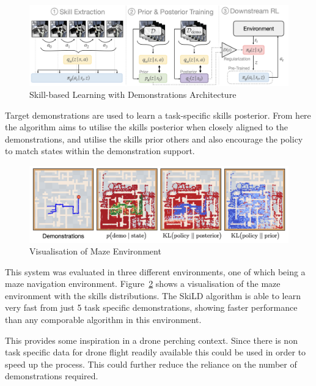 \begin{figure}[htbp]
  \centering
  \includegraphics[width=\textwidth]{background/fyp15-skild-architecture.png}
  \caption{Skill-based Learning with Demonstrations Architecture}
\label{fig:fyp15-skild}
\end{figure}

Target demonstrations are used to learn a task-specific skills posterior.
From here the algorithm aims to utilise the skills posterior when closely aligned to the demonstrations, and utilise the skills prior others and also encourage the policy to match states within the demonstration support.

\begin{figure}[htbp]
  \centering
  \includegraphics[width=\textwidth]{background/fyp15-maze-diagram.png}
  \caption{Visualisation of Maze Environment}
\label{fig:fyp15-maze}
\end{figure}

This system was evaluated in three different environments, one of which being a maze navigation environment.
Figure~\ref{fig:fyp15-maze} shows a visualisation of the maze environment with the skills distributions.
The SkiLD algorithm is able to learn very fast from just 5 task specific demonstrations, showing faster performance than any comporable algorithm in this environment.

This provides some inspiration in a drone perching context.
Since there is non task specific data for drone flight readily available this could be used in order to speed up the process.
This could further reduce the reliance on the number of demonstrations required.